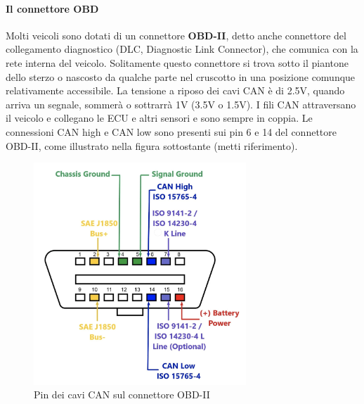 \documentclass[12pt, a4paper, italian]{report}
\numberwithin{figure}{chapter}
\numberwithin{table}{chapter}
\begin{document}
\paragraph{Il connettore OBD} Molti veicoli sono dotati di un connettore \textbf{OBD-II}, detto anche connettore del collegamento diagnostico (DLC, Diagnostic Link Connector), che comunica con la rete interna del veicolo. Solitamente questo connettore si trova sotto il piantone dello sterzo o nascosto da qualche parte nel cruscotto in una posizione comunque relativamente accessibile.
La tensione a riposo dei cavi CAN è di 2.5V, quando arriva un segnale, sommerà o sottrarrà 1V (3.5V o 1.5V). I fili CAN attraversano il veicolo e collegano le ECU e altri sensori e sono sempre in coppia. Le connessioni CAN high e CAN low sono presenti sui pin 6 e 14 del connettore OBD-II, come illustrato nella figura sottostante (metti riferimento).


\begin{figure}[h]
  \centering
  \includegraphics[width=8cm]{Connettore_OBD-II.png}
  \caption{Pin dei cavi CAN sul connettore OBD-II}
  \label{fig:Connettore OBD}
\end{figure}
\end{document}
